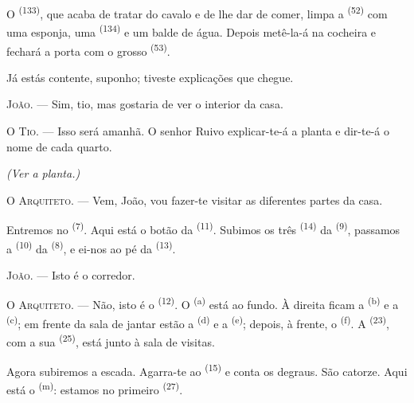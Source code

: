 O  \textsuperscript{(133)}, que acaba de tratar do
cavalo e de lhe dar de comer, limpa a  \textsuperscript{(52)}
com uma esponja, uma  \textsuperscript{(134)} e um balde de
água. Depois metê-la-á na cocheira e fechará a porta com o grosso
 \textsuperscript{(53)}.

Já estás contente, suponho; tiveste explicações que chegue.

\textsc{João}. --- Sim, tio, mas gostaria de ver o interior da casa.

\textsc{O Tio}. --- Isso será amanhã. O senhor Ruivo explicar-te-á a
planta e dir-te-á o nome de cada quarto.

\VUsaut{3.0mm}
\VUsaut{2.4mm}

{\centering\textit{(Ver a planta.)}\par}
\VUsaut{2.4mm}

\textsc{O Arquiteto}. --- Vem, João, vou fazer-te visitar as diferentes
partes da casa.

Entremos no  \textsuperscript{(7)}. Aqui está o botão da
 \textsuperscript{(11)}. Subimos os três 
\textsuperscript{(14)} da  \textsuperscript{(9)}, passamos a
 \textsuperscript{(10)} da 
\textsuperscript{(8)}, e ei-nos ao pé da  \textsuperscript{(13)}.

\textsc{João}. --- Isto é o corredor.

\textsc{O Arquiteto}. --- Não, isto é o  \textsuperscript{(12)}.
O  \textsuperscript{(a)} está ao fundo. À direita ficam a
 \textsuperscript{(b)} e a 
\textsuperscript{(c)}; em frente da sala de jantar estão a 
\textsuperscript{(d)} e a  \textsuperscript{(e)}; depois, à frente, o
 \textsuperscript{(f)}. A  \textsuperscript{(23)}, com
a sua  \textsuperscript{(25)}, está junto à sala de
visitas.

Agora subiremos a escada. Agarra-te ao 
\textsuperscript{(15)} e conta os degraus. São catorze. Aqui está o 
\textsuperscript{(m)}: estamos no primeiro  \textsuperscript{(27)}.

